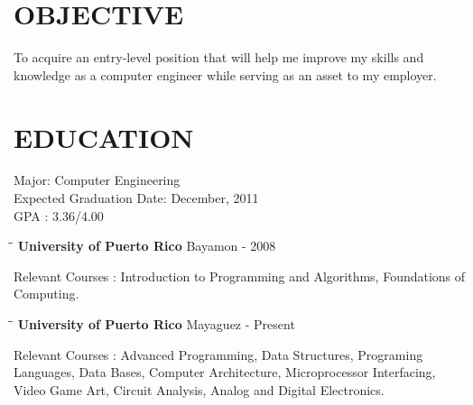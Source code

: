 \documentclass{res}
\begin{document}
 


\address{\bf  POSTAL ADDRESS\\PO Box 942, \\Barranquitas, PR 00794}
\address{\bf CONTACT INFORMATION\\ Cel. : (787) 516-0993 \\ E-Mail : carlos.andreu@upr.edu}
                                  
\begin{resume}

\section{OBJECTIVE}          
    To acquire an entry-level position that will help me improve my skills and knowledge as a computer engineer while serving as an asset to my employer.          
    

 
\section{EDUCATION}          
    Major: Computer Engineering  \\        
    Expected Graduation Date: December, 2011   \\       
    GPA : 3.36/4.00      
    
    
\vspace{-0.1in}  
   \begin{tabbing}
   \hspace{2.3in}\= \hspace{2.6in}\= \kill %
    {\bf University of Puerto Rico} \>Bayamon      - 2008
   \end{tabbing}\vspace{-20pt}      %
Relevant Courses : Introduction to Programming and Algorithms, Foundations of Computing.

   
   \vspace{-0.1in}  
   \begin{tabbing}
   \hspace{2.3in}\= \hspace{2.6in}\= \kill %
    {\bf University of Puerto Rico} \>Mayaguez      - Present
   \end{tabbing}\vspace{-20pt}      %
Relevant Courses : Advanced Programming, Data Structures, Programing Languages, Data Bases, Computer Architecture, Microprocessor Interfacing, Video Game Art, Circuit Analysis, Analog and Digital Electronics.
   

\end{resume}
\end{document}
